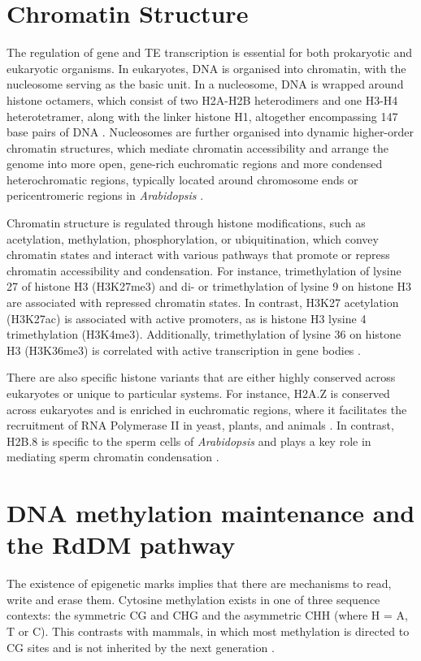 \section{Chromatin Structure}

The regulation of gene and TE transcription is essential for both prokaryotic and eukaryotic organisms. In eukaryotes, DNA is organised into chromatin, with the nucleosome serving as the basic unit. In a nucleosome, DNA is wrapped around histone octamers, which consist of two H2A-H2B heterodimers and one H3-H4 heterotetramer, along with the linker histone H1, altogether encompassing 147 base pairs of DNA \cite{RN294}. Nucleosomes are further organised into dynamic higher-order chromatin structures, which mediate chromatin accessibility and arrange the genome into more open, gene-rich euchromatic regions and more condensed heterochromatic regions, typically located around chromosome ends or pericentromeric regions in \textit{Arabidopsis} \cite{RN299}. 

Chromatin structure is regulated through histone modifications, such as acetylation, methylation, phosphorylation, or ubiquitination, which convey chromatin states and interact with various pathways that promote or repress chromatin accessibility and condensation.  For instance, trimethylation of lysine 27 of histone H3 (H3K27me3) and di- or trimethylation of lysine 9 on histone H3 are associated with repressed chromatin states. In contrast, H3K27 acetylation (H3K27ac) is associated with active promoters, as is histone H3 lysine 4 trimethylation (H3K4me3). Additionally, trimethylation of lysine 36 on histone H3 (H3K36me3) is correlated with active transcription in gene bodies \cite{RN297,RN298}. 

There are also specific histone variants that are either highly conserved across eukaryotes or unique to particular systems. For instance, H2A.Z is conserved across eukaryotes and is enriched in euchromatic regions, where it facilitates the recruitment of RNA Polymerase II in yeast, plants, and animals \cite{RN295,RN296}. In contrast, H2B.8 is specific to the sperm cells of \textit{Arabidopsis} and plays a key role in mediating sperm chromatin condensation \cite{RN285}.

\section{DNA methylation maintenance and the RdDM pathway} 

The existence of epigenetic marks implies that there are mechanisms to read, write and erase them. Cytosine methylation exists in one of three sequence contexts: the symmetric CG and CHG and the asymmetric CHH (where H = A, T or C).  This contrasts with mammals, in  which most methylation is directed to CG sites  and is not inherited by the next generation \cite{RN228}. 

